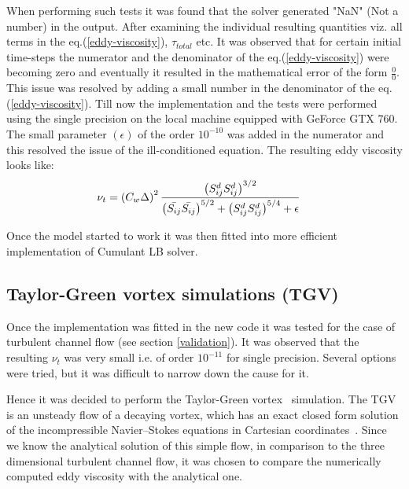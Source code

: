 When performing such tests it was found that the solver generated "NaN" (Not a number) in the output. After examining the individual resulting quantities viz. all terms in the eq.(\ref{eddy-viscosity}), $\tau_{total}$ etc. It was observed that for certain initial time-steps the numerator and the denominator of the eq.(\ref{eddy-viscosity}) were becoming zero and eventually it resulted in the mathematical error of the form $\frac{0}{0}$.\\
This issue was resolved by adding a small number in the denominator of the eq.(\ref{eddy-viscosity}). Till now the implementation and the tests were performed using the single precision on the local machine equipped with GeForce GTX 760. The small parameter $\left(\epsilon\right)$ of the order $10^{-10}$ was added in the numerator and this resolved the issue of the ill-conditioned equation. The resulting eddy viscosity looks like:
%
\begin{equation}
\label{mod eddy visc}
\begin{split}
{\nu_t} &= \left({C_w}{\Delta}\right)^{2} \frac{\left({S_{ij}^{d}}{S_{ij}^{d}}\right)^{3/2}}{\left(\bar{S_{ij}} \bar{S_{ij}}\right)^{5/2} + {\left({S_{ij}^{d}}{S_{ij}^{d}}\right)^{5/4}} + \epsilon} 
\end{split}
\end{equation}
%

Once the model started to work it was then fitted into more efficient implementation of Cumulant LB solver. 
\subsection{Taylor-Green vortex simulations (TGV)}

Once the implementation was fitted in the new code it was tested for the case of turbulent channel flow (see section \ref{validation}). It was observed that the resulting $\nu_t$ was very small i.e. of order $10^{-11}$ for single precision. Several options were tried, but it was difficult to narrow down the cause for it. 

Hence it was decided to perform the Taylor-Green vortex~\cite{taylor:green} simulation. The TGV is an unsteady flow of a decaying vortex, which has an exact closed form solution of the incompressible Navier–Stokes equations in Cartesian coordinates~\cite{wiki:tgv}. Since we know the analytical solution of this simple flow, in comparison to the three dimensional turbulent channel flow, it was chosen to compare the numerically computed eddy viscosity with the analytical one. 

